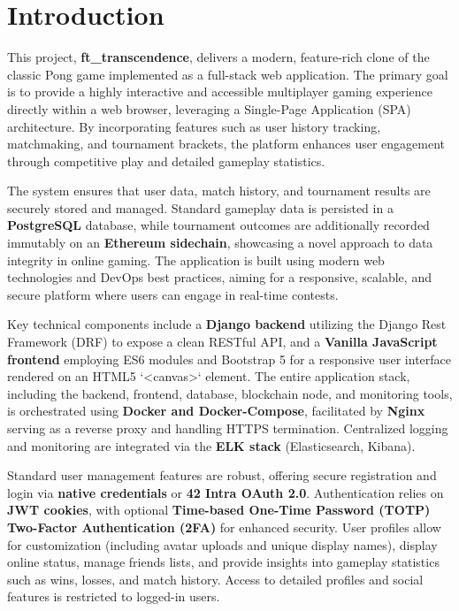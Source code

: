 




\chapter{Introduction} %

This project, \textbf{ft\_transcendence}, delivers a modern, feature-rich clone of the classic Pong game implemented as a full-stack web application. The primary goal is to provide a highly interactive and accessible multiplayer gaming experience directly within a web browser, leveraging a Single-Page Application (SPA) architecture. By incorporating features such as user history tracking, matchmaking, and tournament brackets, the platform enhances user engagement through competitive play and detailed gameplay statistics.

The system ensures that user data, match history, and tournament results are securely stored and managed. Standard gameplay data is persisted in a \textbf{PostgreSQL} database, while tournament outcomes are additionally recorded immutably on an \textbf{Ethereum sidechain}, showcasing a novel approach to data integrity in online gaming. The application is built using modern web technologies and DevOps best practices, aiming for a responsive, scalable, and secure platform where users can engage in real-time contests.

Key technical components include a \textbf{Django backend} utilizing the Django Rest Framework (DRF) to expose a clean RESTful API, and a \textbf{Vanilla JavaScript frontend} employing ES6 modules and Bootstrap 5 for a responsive user interface rendered on an HTML5 `<canvas>` element. The entire application stack, including the backend, frontend, database, blockchain node, and monitoring tools, is orchestrated using \textbf{Docker and Docker-Compose}, facilitated by \textbf{Nginx} serving as a reverse proxy and handling HTTPS termination. Centralized logging and monitoring are integrated via the \textbf{ELK stack} (Elasticsearch, Kibana).

Standard user management features are robust, offering secure registration and login via \textbf{native credentials} or \textbf{42 Intra OAuth 2.0}. Authentication relies on \textbf{JWT cookies}, with optional \textbf{Time-based One-Time Password (TOTP) Two-Factor Authentication (2FA)} for enhanced security. User profiles allow for customization (including avatar uploads and unique display names), display online status, manage friends lists, and provide insights into gameplay statistics such as wins, losses, and match history. Access to detailed profiles and social features is restricted to logged-in users.

